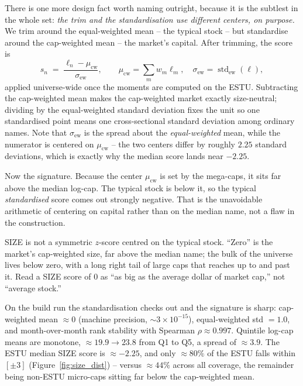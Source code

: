 \documentclass[11pt]{article}
\theoremstyle{definition}
\theoremstyle{plain}
\theoremstyle{remark}
\DeclareMathOperator{\std}{std}
\begin{document}
There is one more design fact worth naming outright, because it is the subtlest in the whole set: \emph{the trim and the standardisation use different centers, on purpose.} We trim around the equal-weighted mean -- the typical stock -- but standardise around the cap-weighted mean -- the market's capital. After trimming, the score is
\[
s_n \;=\; \frac{\ell_n - \mu_{\mathrm{cw}}}{\sigma_{\mathrm{ew}}},
\qquad
\mu_{\mathrm{cw}} = \sum_{m} w_m \ell_m,
\quad
\sigma_{\mathrm{ew}} = \std\nolimits_{\mathrm{ew}}(\ell),
\]
applied universe-wide once the moments are computed on the ESTU. Subtracting the cap-weighted mean makes the cap-weighted market exactly size-neutral; dividing by the equal-weighted standard deviation fixes the unit so one standardised point means one cross-sectional standard deviation among ordinary names. Note that $\sigma_{\mathrm{ew}}$ is the spread about the \emph{equal-weighted} mean, while the numerator is centered on $\mu_{\mathrm{cw}}$ -- the two centers differ by roughly $2.25$ standard deviations, which is exactly why the median score lands near $-2.25$.

Now the signature. Because the center $\mu_{\mathrm{cw}}$ is set by the mega-caps, it sits far above the median log-cap. The typical stock is below it, so the typical \emph{standardised} score comes out strongly negative. That is the unavoidable arithmetic of centering on capital rather than on the median name, not a flaw in the construction.

\begin{intuition}
SIZE is not a symmetric $z$-score centred on the typical stock. ``Zero'' is the market's cap-weighted size, far above the median name; the bulk of the universe lives below zero, with a long right tail of large caps that reaches up to and past it. Read a SIZE score of $0$ as ``as big as the average dollar of market cap,'' not ``average stock.''
\end{intuition}

\begin{observed}
On the build run the standardisation checks out and the signature is sharp: cap-weighted mean $\approx 0$ (machine precision, $\sim3\times10^{-15}$), equal-weighted std $= 1.0$, and month-over-month rank stability with Spearman $\rho \approx 0.997$. Quintile log-cap means are monotone, $\approx 19.9 \to 23.8$ from Q1 to Q5, a spread of $\approx 3.9$. The ESTU median SIZE score is $\approx -2.25$, and only $\approx 80\%$ of the ESTU falls within $[\pm 3]$ (Figure~\ref{fig:size_dist}) -- versus $\approx 44\%$ across all coverage, the remainder being non-ESTU micro-caps sitting far below the cap-weighted mean.
\end{observed}
\end{document}
